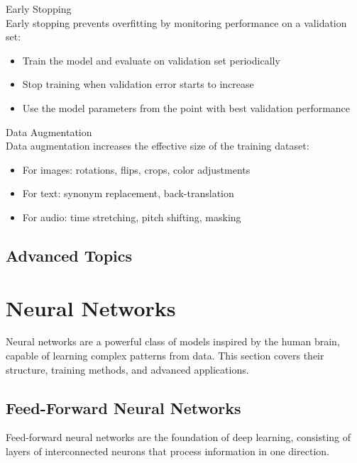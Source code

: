\begin{definition}{Early Stopping}\\
Early stopping prevents overfitting by monitoring performance on a validation set:
\begin{itemize}
    \item Train the model and evaluate on validation set periodically
    \item Stop training when validation error starts to increase
    \item Use the model parameters from the point with best validation performance
\end{itemize}
\end{definition}

\begin{definition}{Data Augmentation}\\
Data augmentation increases the effective size of the training dataset:
\begin{itemize}
    \item For images: rotations, flips, crops, color adjustments
    \item For text: synonym replacement, back-translation
    \item For audio: time stretching, pitch shifting, masking
\end{itemize}
\end{definition}

\subsection{Advanced Topics}


\section{Neural Networks}

Neural networks are a powerful class of models inspired by the human brain, capable of learning complex patterns from data. This section covers their structure, training methods, and advanced applications.

\subsection{Feed-Forward Neural Networks}

Feed-forward neural networks are the foundation of deep learning, consisting of layers of interconnected neurons that process information in one direction.

